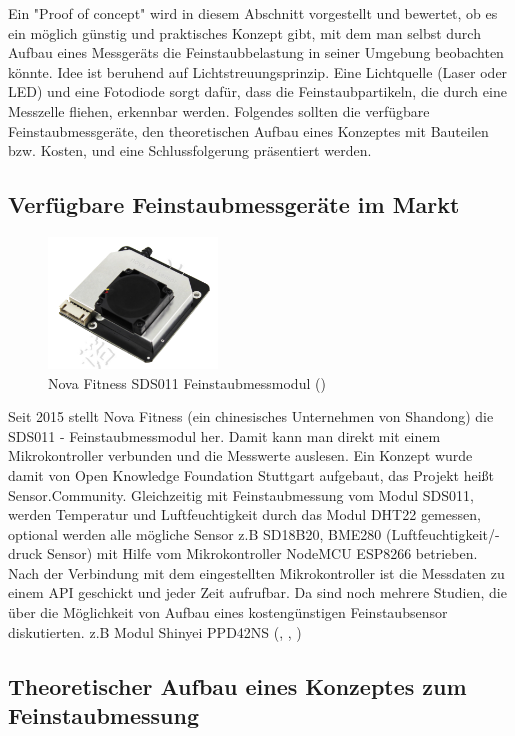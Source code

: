 \documentclass[12pt]{article}
\begin{document}
Ein "Proof of concept" wird in diesem Abschnitt vorgestellt und bewertet, ob es ein möglich günstig und praktisches Konzept gibt, mit dem man selbst durch Aufbau eines Messgeräts die Feinstaubbelastung in seiner Umgebung beobachten könnte. Idee ist beruhend auf Lichtstreuungsprinzip. Eine Lichtquelle (Laser oder LED) und eine Fotodiode sorgt dafür, dass die Feinstaubpartikeln, die durch eine Messzelle fliehen, erkennbar werden. Folgendes sollten die verfügbare Feinstaubmessgeräte, den theoretischen Aufbau eines Konzeptes mit Bauteilen bzw. Kosten, und eine Schlussfolgerung präsentiert werden.  

\subsection{Verfügbare Feinstaubmessgeräte im Markt}
\begin{figure}[h!]
  \centering
  \label{fig:sds011}
  \includegraphics[width=0.4\textwidth]{sds011}
  \caption{Nova Fitness SDS011 Feinstaubmessmodul (\cite{Inovafitness.2020})}
\end{figure}
Seit 2015 stellt Nova Fitness (ein chinesisches Unternehmen von Shandong) die SDS011 - Feinstaubmessmodul her. Damit kann man direkt mit einem Mikrokontroller verbunden und die Messwerte auslesen. Ein Konzept wurde damit von Open Knowledge Foundation Stuttgart aufgebaut, das Projekt heißt Sensor.Community. Gleichzeitig mit Feinstaubmessung vom Modul SDS011, werden Temperatur und Luftfeuchtigkeit durch das Modul DHT22 gemessen, optional werden alle mögliche Sensor z.B SD18B20, BME280 (Luftfeuchtigkeit/-druck Sensor) mit Hilfe vom Mikrokontroller NodeMCU ESP8266 betrieben. Nach der Verbindung mit dem eingestellten Mikrokontroller ist die Messdaten zu einem API geschickt und jeder Zeit aufrufbar. Da sind noch mehrere Studien, die über die Möglichkeit von Aufbau eines kostengünstigen Feinstaubsensor diskutierten. z.B Modul Shinyei PPD42NS (\cite{Austin.2015}, \cite{Holstius.2014}, \cite{Gao.2015} )

\subsection{Theoretischer Aufbau eines Konzeptes zum Feinstaubmessung}
\end{document}
